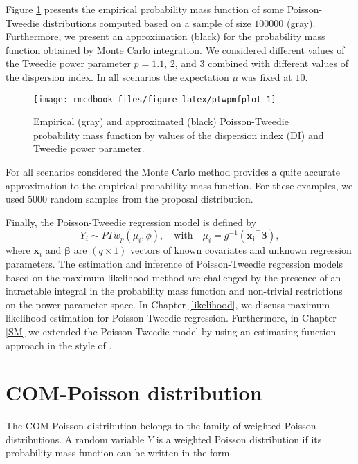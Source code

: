 \documentclass[9pt,a5paper,]{book}
\theoremstyle{definition}
\theoremstyle{definition}
\theoremstyle{remark}
\begin{document}
Figure \ref{fig:ptwpmfplot} presents the empirical probability mass
function of some Poisson-Tweedie distributions computed based on a
sample of size \(100000\) (gray). Furthermore, we present an
approximation (black) for the probability mass function obtained by
Monte Carlo integration. We considered different values of the Tweedie
power parameter \(p = 1.1\), \(2\), and \(3\) combined with different
values of the dispersion index. In all scenarios the expectation \(\mu\)
was fixed at \(10\).

\begin{figure}[h]

{\centering \texttt{[image: rmcdbook\_files/figure-latex/ptwpmfplot-1]} 

}

\caption{Empirical (gray) and approximated (black) Poisson-Tweedie probability mass function by values of the dispersion index (DI) and Tweedie power parameter.}\label{fig:ptwpmfplot}
\end{figure}

For all scenarios considered the Monte Carlo method provides a quite
accurate approximation to the empirical probability mass function. For
these examples, we used \(5000\) random samples from the proposal
distribution.

Finally, the Poisson-Tweedie regression model is defined by
\[Y_i \sim PTw_{p}(\mu_i, \phi), \quad  \text{with} \quad \mu_i = g^{-1}(\boldsymbol{x_i}^{\top} \boldsymbol{\beta}),\]
where \(\boldsymbol{x}_i\) and \(\boldsymbol{\beta}\) are
\((q \times 1)\) vectors of known covariates and unknown regression
parameters. The estimation and inference of Poisson-Tweedie regression
models based on the maximum likelihood method are challenged by the
presence of an intractable integral in the probability mass function and
non-trivial restrictions on the power parameter space. In Chapter
\ref{likelihood}, we discuss maximum likelihood estimation for
Poisson-Tweedie regression. Furthermore, in Chapter \ref{SM} we extended
the Poisson-Tweedie model by using an estimating function approach in
the style of \citet{Wedderburn1974}.

\section{COM-Poisson distribution}\label{com-poisson-distribution}

The COM-Poisson distribution belongs to the family of weighted Poisson
distributions. A random variable \(Y\) is a weighted Poisson
distribution if its probability mass function can be written in the form
\end{document}
